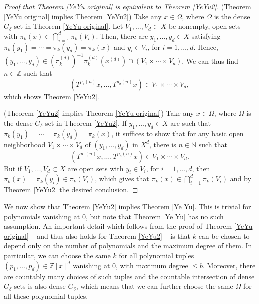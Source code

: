 \documentclass[reqno]{amsart}
\def\Z{{\mathbb Z}}
\def\N{{\mathbb N}}
\theoremstyle{definition}
\theoremstyle{remark}
\def\N{{\mathbb N}}
\begin{document}
\begin{proof}[Proof that Theorem \ref{YeYu original} is equivalent to Theorem \ref{YeYu2}]
(Theorem \ref{YeYu original} implies Theorem \ref{YeYu2}) 
Take any $x\in \Omega$, where $\Omega$ is the dense $G_{\delta}$ set in Theorem \ref{YeYu original}. Let $V_1,\ldots,V_d \subset X$ be nonempty, open sets with $\pi_k(x) \in \bigcap_{i=1}^d \pi_k(V_i)$. Then, there are $y_1,\ldots,y_d\in X$ satisfying $\pi_k(y_1)=\cdots=\pi_k(y_d)=\pi_k(x)$ and $y_i\in V_i$, for $i=1,\ldots,d$. Hence, $(y_1,\ldots,y_d)\in (\pi_k^{(d)})^{-1} \pi_k^{(d)} (x^{(d)}) \cap (V_1\times \cdots \times V_d)$. We can thus find $n\in \Z$ such that 
$$(T^{p_1(n)}x,\ldots,T^{p_d(n)}x) \in V_1\times \cdots \times V_d,$$
which shows Theorem \ref{YeYu2}.

(Theorem \ref{YeYu2} implies Theorem \ref{YeYu original}) 
Take any $x\in \Omega$, where $\Omega$ is the dense $G_{\delta}$ set in Theorem \ref{YeYu2}. If $y_1,\ldots,y_d\in X$ are such that $\pi_k(y_1)=\cdots=\pi_k(y_d)=\pi_k(x)$, it suffices to show that for any basic open neighborhood $V_1\times \cdots \times V_d$ of $(y_1,\ldots,y_d)$ in $X^d$, there is $n\in \N$ such that 
$$(T^{p_1(n)}x,\ldots,T^{p_d(n)}x) \in V_1\times \cdots \times V_d.$$
But if $V_1,\ldots,V_d\subset X$ are open sets with $y_i\in V_i$, for $i=1,\ldots,d$, then $\pi_k(x)=\pi_k(y_i)\in \pi_k(V_i)$, which gives that $\pi_k(x) \in \bigcap_{i=1}^d \pi_k(V_i)$ and by Theorem \ref{YeYu2} the desired conclusion.
\end{proof}

We now show that Theorem \ref{YeYu2} implies Theorem \ref{Ye Yu}. This is trivial for polynomials vanishing at $0$, but note that Theorem \ref{Ye Yu} has no such assumption. An important detail which follows from the proof of Theorem \ref{YeYu original} -- and thus also holds for Theorem \ref{YeYu2} -- is that $k$ can be chosen to depend only on the number of polynomials and the maximum degree of them. In particular, we can choose the same $k$ for all polynomial tuples $(p_1,\ldots,p_d)\in \Z[x]^d$ vanishing at $0$, with maximum degree $\leq b$. Moreover, there are countably many choices of such tuples and the countable intersection of dense $G_{\delta}$ sets is also dense $G_{\delta}$, which means that we can further choose the same $\Omega$ for all these polynomial tuples.
\end{document}

